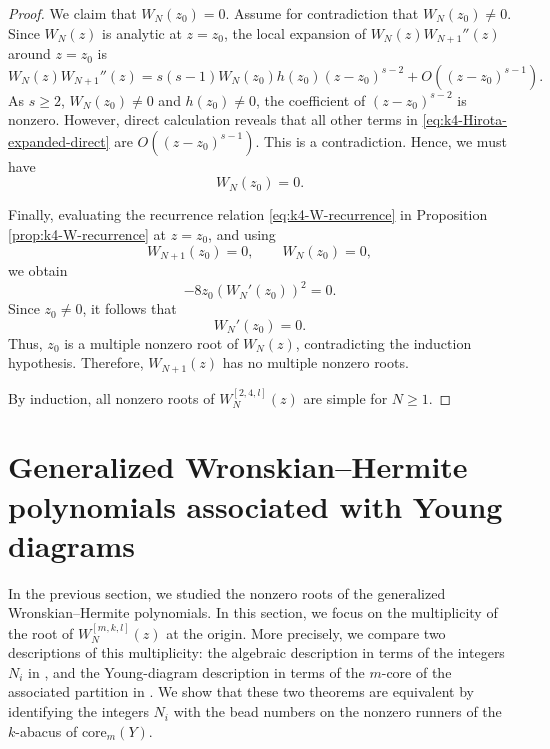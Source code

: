 \documentclass[preprint,3p,10pt]{elsarticle}
\theoremstyle{definition}
\begin{document}
\begin{proof}
We claim that $W_N(z_0) = 0$. Assume for contradiction that $W_N(z_0) \neq 0$. Since $W_N(z)$ is analytic at $z=z_0$, 
the local expansion of  $W_N(z)W_{N+1}''(z)$ around $z=z_0$ is 
\begin{equation}
    W_N(z)W_{N+1}''(z) = s(s-1)W_N(z_0)h(z_0)(z-z_0)^{s-2} + O\left((z-z_0)^{s-1}\right).
\end{equation}
As $s \ge 2$, $W_N(z_0) \neq 0$ and $h(z_0) \neq 0$, the coefficient of $(z-z_0)^{s-2}$ is nonzero. However, direct calculation reveals that all other terms in \eqref{eq:k4-Hirota-expanded-direct} are $O\left((z-z_0)^{s-1}\right)$.
This is a contradiction. Hence, we must have
\begin{equation}
    W_N(z_0) = 0.
\end{equation}

Finally, evaluating the recurrence relation \eqref{eq:k4-W-recurrence} in Proposition \ref{prop:k4-W-recurrence} at \(z=z_0\), and using
\begin{equation}
    W_{N+1}(z_0)=0,
    \qquad
    W_N(z_0)=0,
\end{equation}
we obtain
\begin{equation}
    -8z_0\left(W_N'(z_0)\right)^2=0.
\end{equation}
Since \(z_0\neq0\), it follows that
\begin{equation}
    W_N'(z_0)=0.
\end{equation}
Thus, \(z_0\) is a multiple nonzero root of \(W_N(z)\), contradicting the induction hypothesis.
Therefore, \(W_{N+1}(z)\) has no multiple nonzero roots. 

By induction, all nonzero roots of \(W_N^{[2,4,l]}(z)\) are simple for \(N\geq1\). 
\end{proof}



\section{Generalized Wronskian--Hermite polynomials associated with Young diagrams}\label{sec:WH with partition}
In the previous section, we studied the nonzero roots of the generalized
Wronskian--Hermite polynomials. In this section, we focus on the multiplicity of the root of
\(W_N^{[m,k,l]}(z)\) at the origin. More precisely, we compare two
descriptions of this multiplicity: the algebraic description in terms of the
integers \(N_i\) in \cite{lin2024rogue}, and the Young-diagram description in terms of the
\(m\)-core of the associated partition in \cite{bonneux2020coefficients}. We show that these two theorems
are equivalent by identifying the integers \(N_i\) with the bead numbers on
the nonzero runners of the \(k\)-abacus of \(\mathrm{core}_m(Y)\).
\end{document}
